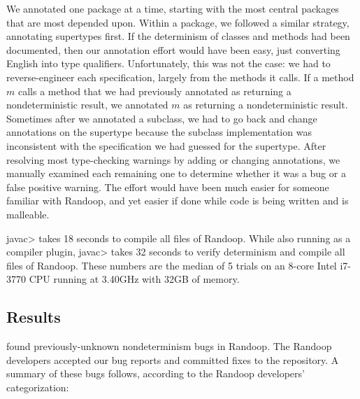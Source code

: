 We annotated one package at a time, starting with the most central packages
that are most depended upon.  Within a package, we followed a similar
strategy, annotating supertypes first.  If the determinism of classes and methods had been
documented, then our annotation effort
would have been easy, just converting English into type qualifiers.
Unfortunately, this was not the case: we had to reverse-engineer each
specification, largely from the methods it calls.  If a method $m$ calls a
method that we had previously annotated as returning a nondeterministic result, we annotated
$m$ as returning a nondeterministic result.
Sometimes after we
annotated a subclass, we had to go back and change annotations on
the supertype because the subclass implementation was
inconsistent with the specification we had guessed for the supertype.
After resolving most type-checking warnings by adding or changing
annotations, we manually examined each remaining one to determine whether
it was a bug or a false positive warning.
The effort would have been much easier for someone familiar with Randoop,
and yet easier if done while code is being written and is malleable.

\<javac> takes 18 seconds to compile all files of Randoop.
While also running \theDeterminismChecker as a compiler plugin, \<javac> takes 32 seconds to verify determinism and compile all files of Randoop.
These numbers are the median of 5 trials on an 8-core Intel i7-3770 CPU running at 3.40GHz with 
32GB of memory.


\subsection{Results}

\TheDeterminismChecker found \numRandoopBugs previously-unknown nondeterminism bugs in Randoop.
The Randoop developers accepted our bug reports and committed fixes to the repository. A summary
of these bugs follows, according to the Randoop developers' categorization:

